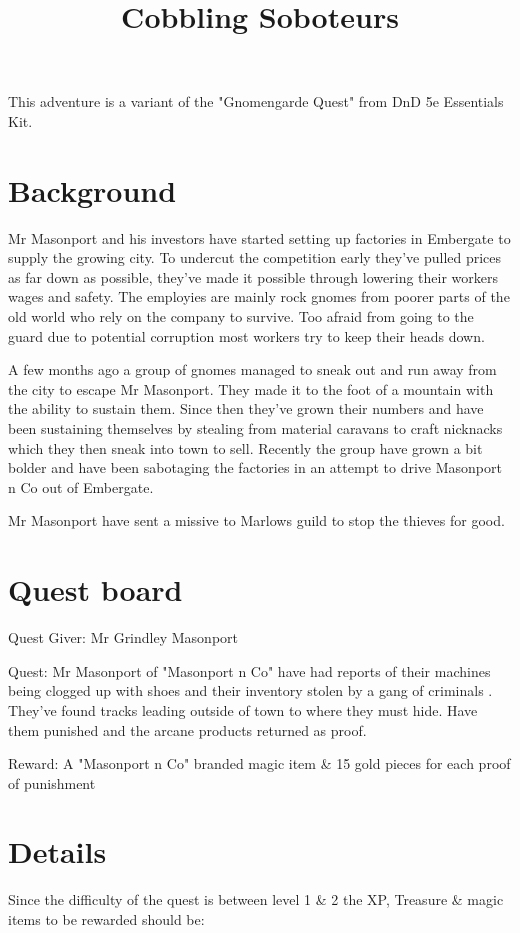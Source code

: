 \documentclass{article}
\title{Cobbling Soboteurs}
\begin{document}
    This adventure is a variant of the "Gnomengarde Quest" from DnD 5e Essentials Kit.

    \section{Background}

    Mr Masonport and his investors have started setting up factories in Embergate to supply the growing city. 
    To undercut the competition early they've pulled prices as far down as possible, they've made it possible through lowering their workers wages and safety.
    The employies are mainly rock gnomes from poorer parts of the old world who rely on the company to survive. 
    Too afraid from going to the guard due to potential corruption most workers try to keep their heads down. 

    A few months ago a group of gnomes managed to sneak out and run away from the city to escape Mr Masonport. 
    They made it to the foot of a mountain with the ability to sustain them. 
    Since then they've grown their numbers and have been sustaining themselves by stealing from material caravans to craft nicknacks which they then sneak into town to sell.
    Recently the group have grown a bit bolder and have been sabotaging the factories in an attempt to drive Masonport n Co out of Embergate.

    Mr Masonport have sent a missive to Marlows guild to stop the thieves for good.

    \section{Quest board}

    Quest Giver: Mr Grindley Masonport 

    Quest: Mr Masonport of "Masonport n Co" have had reports of their machines being clogged up with shoes and their inventory stolen by a gang of criminals . They've found tracks leading outside of town to where they must hide. Have them punished and the arcane products returned as proof. 

    Reward: A "Masonport n Co" branded magic item \& 15 gold pieces for each proof of punishment 

    \section{Details}

    Since the difficulty of the quest is between level 1 \& 2 the XP, Treasure \& magic items to be rewarded should be:
\end{document}
